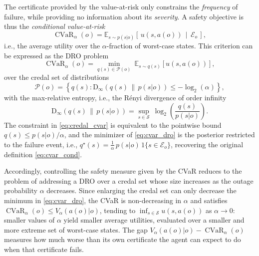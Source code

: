 \documentclass[journal]{IEEEtran}
\theoremstyle{definition}
\theoremstyle{remark}
\DeclareMathOperator{\CVaR}{CVaR}
\newcommand{\Dinf}{\mathrm{D}_{\infty}}
\begin{document}
{The certificate provided by the value-at-risk only constrains the \emph{frequency} of failure, while providing no information about its \emph{severity}. A safety objective is thus the \emph{conditional value-at-risk}
%
\begin{equation}
  \CVaR_{\alpha}(o)
  =\mathbb{E}_{s\sim p(s|o)}\!\left[\,u(s,a(o))\,\middle|\,\mathcal{E}_{o}\,\right],
  \label{eq:cvar_cond}
\end{equation}
%
i.e., the average utility over the $\alpha$-fraction of worst-case states. This criterion can be expressed as the DRO problem \cite{ang2018dual}
%
\begin{equation}
  \CVaR_{\alpha}(o)
  =\min_{q(s)\in\mathcal{P}(o)}\ \mathbb{E}_{s\sim q(s)}\!\left[u(s,a(o))\right],
  \label{eq:cvar_dro}
\end{equation}
%
over the credal set of distributions
%
\begin{equation}
  \mathcal{P}(o)=\left\{q(s):
  \Dinf\!\left(q(s)\,\|\,p(s|o)\right)\leq-\log_{2}(\alpha)\right\},
  \label{eq:credal_cvar}
\end{equation}
%
with the max-relative entropy, i.e., the R\'enyi divergence of order infinity \cite{Simeone2026CQIT}
%
\begin{equation}
  \Dinf\!\left(q(s)\,\|\,p(s|o)\right)
  =\sup_{s\in\mathcal{S}}\ \log_{2}\!\left(\frac{q(s)}{p(s|o)}\right).
  \label{eq:dmax}
\end{equation}
%
The constraint in \eqref{eq:credal_cvar} is equivalent to the pointwise bound $q(s)\leq p(s|o)/\alpha$, and the minimizer of \eqref{eq:cvar_dro} is the posterior restricted to the failure event, i.e., $q^{\star}(s)=\frac{1}{\alpha}\,p(s|o)\,\mathrm{1}\{s\in\mathcal{E}_{o}\}$, recovering the original definition \eqref{eq:cvar_cond}.

Accordingly, controlling the safety measure given by the CVaR reduces to the problem of addressing a DRO over a credal set whose size increases as the outage probability $\alpha$ decreases. Since enlarging the credal set can only decrease the minimum in \eqref{eq:cvar_dro}, the CVaR is non-decreasing in $\alpha$ and satisfies $\CVaR_{\alpha}(o)\leq V_{\alpha}(a(o)|o)$, tending to $\inf_{s\in\mathcal{S}}u(s,a(o))$ as $\alpha\to0$: smaller values of $\alpha$ yield smaller average utilities, evaluated over a smaller and more extreme set of worst-case states. The gap $V_{\alpha}(a(o)|o)-\CVaR_{\alpha}(o)$ measures how much worse than its own certificate the agent can expect to do when that certificate fails.


}
\end{document}

